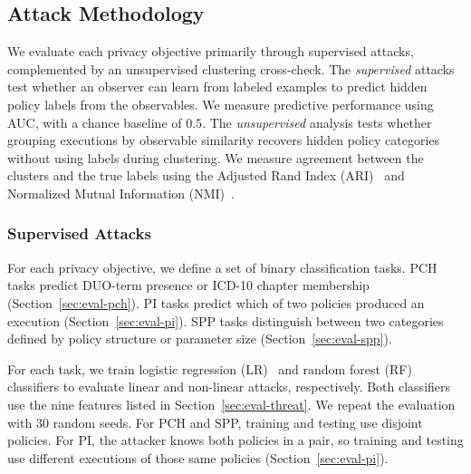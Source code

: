 \subsection{Attack Methodology}
\label{sec:eval-method}

We evaluate each privacy objective primarily through supervised attacks, complemented by an unsupervised clustering cross-check.
The \emph{supervised} attacks test whether an observer can learn from labeled examples to predict hidden policy labels from the observables.
We measure predictive performance using AUC, with a chance baseline of $0.5$.
The \emph{unsupervised} analysis tests whether grouping executions by observable similarity recovers hidden policy categories without using labels during clustering.
We measure agreement between the clusters and the true labels using the Adjusted Rand Index (ARI)~\cite{hubert1985comparing} and Normalized Mutual Information (NMI)~\cite{vinh2010information}.


\subsubsection{Supervised Attacks}
For each privacy objective, we define a set of binary classification tasks.
PCH tasks predict DUO-term presence or ICD-10 chapter membership (Section~\ref{sec:eval-pch}).
PI tasks predict which of two policies produced an execution (Section~\ref{sec:eval-pi}).
SPP tasks distinguish between two categories defined by policy structure or parameter size (Section~\ref{sec:eval-spp}).

For each task, we train logistic regression (LR)~\cite{cox1958regression} and random forest (RF)~\cite{breiman2001random} classifiers to evaluate linear and non-linear attacks, respectively.
Both classifiers use the nine features listed in Section~\ref{sec:eval-threat}.
We repeat the evaluation with $30$ random seeds.
For PCH and SPP, training and testing use disjoint policies.
For PI, the attacker knows both policies in a pair, so training and testing use different executions of those same policies (Section~\ref{sec:eval-pi}).

